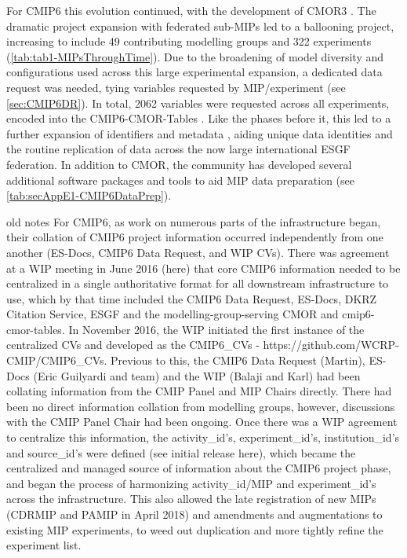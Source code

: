 \documentclass[manuscript]{copernicus}
\begin{document}
{For CMIP6 this evolution continued, with the development of CMOR3 \citep{mauzey_cmor_2024}. The dramatic project expansion with federated sub-MIPs led to a ballooning project, increasing to include 49 contributing modelling groups and 322 experiments (\autoref{tab:tab1-MIPsThroughTime}). Due to the broadening of model diversity and configurations used across this large experimental expansion, a dedicated data request was needed, tying variables requested by MIP/experiment (see \autoref{sec:CMIP6DR}). In total, 2062 variables were requested across all experiments, encoded into the CMIP6-CMOR-Tables \citep{nadeau_cmip6_2017}. Like the phases before it, this led to a further expansion of identifiers and metadata \citep{taylor_pcmdi_2018}, aiding unique data identities and the routine replication of data across the now large international ESGF federation. In addition to CMOR, the community has developed several additional software packages and tools to aid MIP data preparation (see \autoref{tab:secAppE1-CMIP6DataPrep}).

old notes
For CMIP6, as work on numerous parts of the infrastructure began, their collation of CMIP6 project information occurred independently from one another (ES-Docs, CMIP6 Data Request, and WIP CVs). There was agreement at a WIP meeting in June 2016 (here) that core CMIP6 information needed to be centralized in a single authoritative format for all downstream infrastructure to use, which by that time included the CMIP6 Data Request, ES-Docs, DKRZ Citation Service, ESGF and the modelling-group-serving CMOR and cmip6-cmor-tables. In November 2016, the WIP initiated the first instance of the centralized CVs and developed as the CMIP6_CVs - https://github.com/WCRP-CMIP/CMIP6_CVs. Previous to this, the CMIP6 Data Request (Martin), ES-Docs (Eric Guilyardi and team) and the WIP (Balaji and Karl) had been collating information from the CMIP Panel and MIP Chairs directly. There had been no direct information collation from modelling groups, however, discussions with the CMIP Panel Chair had been ongoing. Once there was a WIP agreement to centralize this information, the activity_id’s, experiment_id’s, institution_id’s and source_id’s were defined (see initial release here), which became the centralized and managed source of information about the CMIP6 project phase, and began the process of harmonizing activity_id/MIP and experiment_id’s across the infrastructure. This also allowed the late registration of new MIPs (CDRMIP and PAMIP in April 2018) and amendments and augmentations to existing MIP experiments, to weed out duplication and more tightly refine the experiment list.

}
\end{document}
